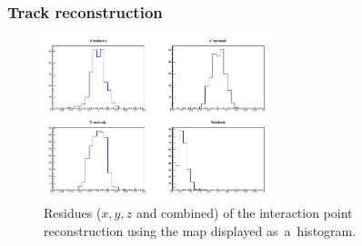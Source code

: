 \documentclass{beamer}
\begin{document}
	\begin{frame}
		\frametitle{Track reconstruction}
		\begin{figure}
			\centering
			\includegraphics[width=0.6\textwidth]{../images/residues_hist.png}
			\caption{Residues ($x,y,z$ and combined) of the interaction point reconstruction using the map displayed as~a~histogram.}
		\end{figure}
	\end{frame}
	
\end{document}
